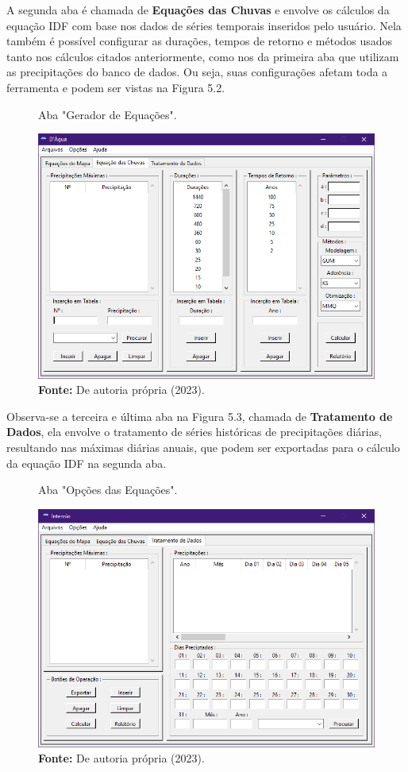  A segunda aba é chamada de \textbf{Equações das Chuvas} e envolve os cálculos da equação IDF com base nos dados de séries temporais inseridos pelo usuário. Nela também é possível configurar as durações, tempos de retorno e métodos usados tanto nos cálculos citados anteriormente, como nos da primeira aba que utilizam as precipitações do banco de dados. Ou seja, suas configurações afetam toda a ferramenta e podem ser vistas na Figura 5.2.

\begin{figure}[!ht]
	\centering
	\caption{Aba "Gerador de Equações".}
	\includegraphics[width=.7625\linewidth]{figuras/equacoes_das_chuvas.png}
	\caption*{\textbf{Fonte:} De autoria própria (2023).}
	\label{fig:equacoes_das_chuvas.png}
\end{figure}

Observa-se a terceira e última aba na Figura 5.3, chamada de \textbf{Tratamento de Dados}, ela envolve o tratamento de séries históricas de precipitações diárias, resultando nas máximas diárias anuais, que podem ser exportadas para o cálculo da equação IDF na segunda aba.\bigskip

\begin{figure}[!ht]
	\centering
	\caption{Aba "Opções das Equações".}
	\includegraphics[width=.7625\linewidth]{figuras/tratamento_de_dados.png}
	\caption*{\textbf{Fonte:} De autoria própria (2023).}
	\label{fig:tratamento_de_dados.png}
\end{figure}

